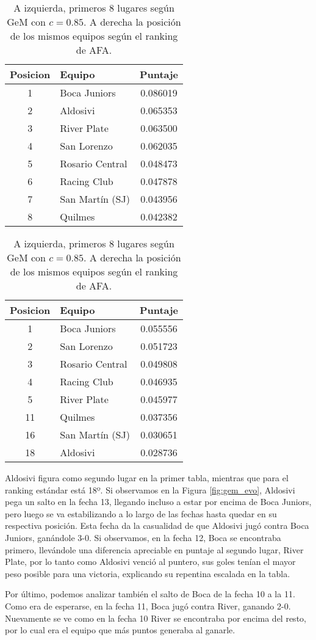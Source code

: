 \begin{table}[H]
	\centering
    \begin{center}
		\begin{tabular}{| c | l | c |}
			\hline
			Posicion & Equipo & Puntaje \\ \hline
			1 & Boca Juniors & 0.086019 \\
			2 & Aldosivi & 0.065353 \\
			3 & River Plate & 0.063500 \\
			4 & San Lorenzo & 0.062035 \\
			5 & Rosario Central & 0.048473 \\
			6 & Racing Club & 0.047878 \\
			7 & San Martín (SJ) & 0.043956 \\
			8 & Quilmes & 0.042382 \\
			\hline
		\end{tabular}
		\begin{tabular}{| c | l | c |}
			\hline
			Posicion & Equipo & Puntaje \\ \hline
			1 & Boca Juniors & 0.055556 \\
			2 & San Lorenzo & 0.051723 \\
			3 & Rosario Central & 0.049808 \\
			4 & Racing Club & 0.046935 \\
			5 & River Plate & 0.045977 \\
			11 & Quilmes & 0.037356 \\
			16 & San Martín (SJ) & 0.030651 \\
			18 & Aldosivi & 0.028736 \\
			\hline
		\end{tabular}
    \end{center}
	\caption{A izquierda, primeros 8 lugares según GeM con $c = 0.85$. A derecha
	la posición de los mismos equipos según el ranking de AFA.}
	\label{fig:primeros8}
\end{table}

Aldosivi figura como segundo lugar en la primer tabla, mientras que para el
ranking estándar está 18º. Si observamos en la Figura \ref{fig:gem_evo},
Aldosivi pega un salto en la fecha 13, llegando incluso a estar por encima de
Boca Juniors, pero luego se va estabilizando a lo largo de las fechas hasta
quedar en su respectiva posición. Esta fecha da la casualidad de que Aldosivi
jugó contra Boca Juniors, ganándole 3-0. Si observamos, en la fecha 12, Boca se
encontraba primero, llevándole una diferencia apreciable en puntaje al
segundo lugar, River Plate, por lo tanto como Aldosivi venció al puntero, sus
goles tenían el mayor peso posible para una victoria, explicando su repentina
escalada en la tabla.

Por último, podemos analizar también el salto de Boca de la fecha 10 a la 11.
Como era de esperarse, en la fecha 11, Boca jugó contra River, ganando 2-0.
Nuevamente se ve como en la fecha 10 River se encontraba por encima del resto,
por lo cual era el equipo que más puntos generaba al ganarle.
